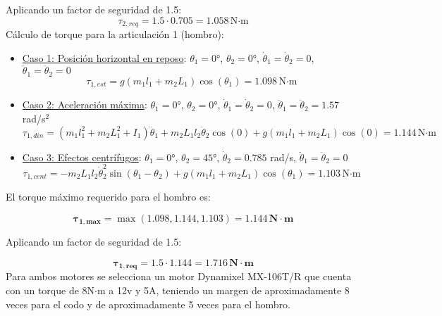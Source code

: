 Aplicando un factor de seguridad de 1.5:
\begin{equation}
\tau_{2,req} = 1.5 \cdot 0.705 = 1.058 \, \text{N·m}
\end{equation}
Cálculo de torque para la articulación 1 (hombro):
\begin{itemize}
    \item \underline{Caso 1: Posición horizontal en reposo}: $\theta_1 = 0°$, $\theta_2 = 0°$, $\dot{\theta}_1 = \dot{\theta}_2 = 0$, $\ddot{\theta}_1 = \ddot{\theta}_2 = 0$ \\
        
        \begin{equation}
        \tau_{1,est} = g(m_1l_1 + m_2L_1)\cos(\theta_1) 
        = 1.098 \, \text{N·m}
        \end{equation}

    \item \underline{Caso 2: Aceleración máxima}: $\theta_1 = 0°$, $\theta_2 = 0°$, $\dot{\theta}_1 = \dot{\theta}_2 = 0$, $\ddot{\theta}_1 = \ddot{\theta}_2 = 1.57$ rad/s$^2$\\
        
        \begin{equation}
        \tau_{1,din} = (m_1l_1^2 + m_2L_1^2 + I_1)\ddot{\theta}_1 + m_2L_1l_2\ddot{\theta}_2\cos(0) + g(m_1l_1 + m_2L_1)\cos(0) = 1.144 \, \text{N·m}
        \end{equation}

    \item \underline{Caso 3: Efectos centrífugos}: $\theta_1 = 0°$, $\theta_2 = 45°$, $\dot{\theta}_2 = 0.785$ rad/s, $\ddot{\theta}_1 = \ddot{\theta}_2 = 0$\\
        
        \begin{equation}
        \tau_{1,cent} = - m_2L_1l_2\dot{\theta}_2^2\sin(\theta_1 - \theta_2) + g(m_1l_1 + m_2L_1)\cos(\theta_1)
        = 1.103 \, \text{N·m}
        \end{equation}
\end{itemize}

El torque máximo requerido para el hombro es:

\begin{equation}
\mathbf{\tau_{1,max}} = \max(1.098, 1.144, 1.103) = \mathbf{1.144 \, N·m }
\end{equation}

Aplicando un factor de seguridad de 1.5:

\begin{equation}
\mathbf{\tau_{1,req}} = 1.5 \cdot 1.144 = \mathbf{1.716 \, N·m }
\end{equation}
Para ambos motores se selecciona un motor Dynamixel MX-106T/R que cuenta con un torque de 8N$\cdot$m a 12v y 5A, teniendo un margen de aproximadamente 8 veces para el codo y de aproximadamente 5 veces para el hombro.